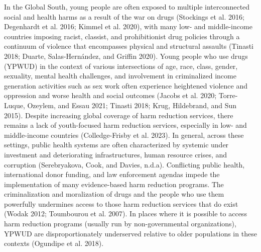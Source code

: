 \documentclass[
  letterpaper,
  DIV=11,
  numbers=noendperiod]{scrartcl}
\begin{document}
In the Global South, young people are often exposed to multiple
interconnected social and health harms as a result of the war on drugs
(Stockings et al. 2016; Degenhardt et al. 2016; Kimmel et al. 2020),
with many low- and middle-income countries imposing racist, classist,
and prohibitionist drug policies through a continuum of violence that
encompasses physical and structural assaults (Tinasti 2018; Duarte,
Salas-Hernández, and Griffin 2020). Young people who use drugs (YPWUD)
in the context of various intersections of age, race, class, gender,
sexuality, mental health challenges, and involvement in criminalized
income generation activities such as sex work often experience
heightened violence and oppression and worse health and social outcomes
(Jacobs et al. 2020; Torre-Luque, Ozeylem, and Essau 2021; Tinasti 2018;
Krug, Hildebrand, and Sun 2015). Despite increasing global coverage of
harm reduction services, there remains a lack of youth-focused harm
reduction services, especially in low- and middle-income countries
(Colledge-Frisby et al. 2023). In general, across these settings, public
health systems are often characterized by systemic under investment and
deteriorating infrastructures, human resource crises, and corruption
(Serebryakova, Cook, and Davies, n.d.a). Conflicting public health,
international donor funding, and law enforcement agendas impede the
implementation of many evidence-based harm reduction programs. The
criminalization and moralization of drugs and the people who use them
powerfully undermines access to those harm reduction services that do
exist (Wodak 2012; Toumbourou et al. 2007). In places where it is
possible to access harm reduction programs (usually run by
non-governmental organizations), YPWUD are disproportionately
underserved relative to older populations in these contexts (Ogundipe et
al. 2018).
\end{document}
